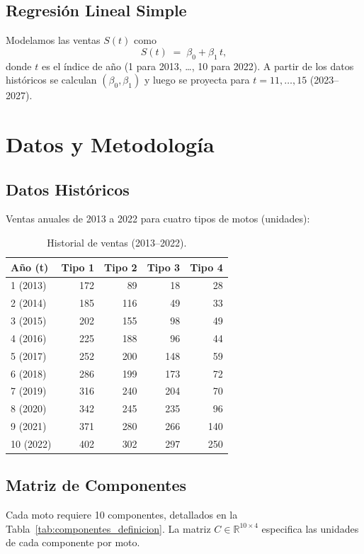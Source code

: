 \documentclass[12pt,a4paper]{article}
\newcommand{\tablesmall}{\scriptsize}
\begin{document}
\subsection{Regresión Lineal Simple}
Modelamos las ventas $S(t)$ como
\[
S(t) \;=\; \beta_0 + \beta_1\,t,
\]
donde $t$ es el índice de año (1 para 2013, \dots, 10 para 2022). A partir de los datos históricos se calculan $(\beta_0,\beta_1)$ y luego se proyecta para $t = 11,\dots,15$ (2023–2027).

\section{Datos y Metodología}
\subsection{Datos Históricos}
Ventas anuales de 2013 a 2022 para cuatro tipos de motos (unidades):
\begin{table}[H]
\tablesmall
\centering
\caption{Historial de ventas (2013–2022).}
\label{tab:ventas_historicas}
\begin{tabular}{@{}lrrrr@{}}
\toprule
Año (t) & Tipo 1 & Tipo 2 & Tipo 3 & Tipo 4 \\ \midrule
1 (2013) & 172 & 89  & 18  & 28  \\
2 (2014) & 185 & 116 & 49  & 33  \\
3 (2015) & 202 & 155 & 98  & 49  \\
4 (2016) & 225 & 188 & 96  & 44  \\
5 (2017) & 252 & 200 & 148 & 59  \\
6 (2018) & 286 & 199 & 173 & 72  \\
7 (2019) & 316 & 240 & 204 & 70  \\
8 (2020) & 342 & 245 & 235 & 96  \\
9 (2021) & 371 & 280 & 266 & 140 \\
10 (2022)& 402 & 302 & 297 & 250 \\ \bottomrule
\end{tabular}
\end{table}

\subsection{Matriz de Componentes}
Cada moto requiere 10 componentes, detallados en la Tabla~\ref{tab:componentes_definicion}. La matriz 
$C \in \mathbb{R}^{10\times 4}$ especifica las unidades de cada componente por moto.
\end{document}
